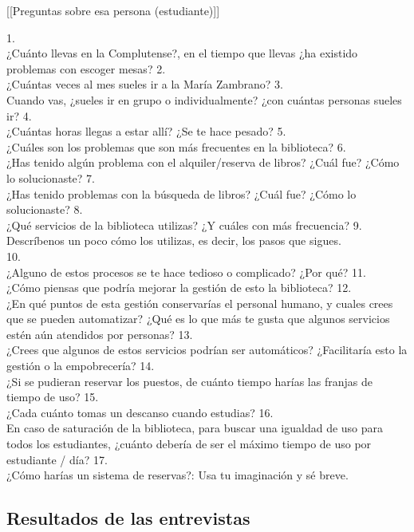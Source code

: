 \documentclass[12pt]{article}
\begin{document}
[[Preguntas sobre esa persona (estudiante)]]

1.\\ ¿Cuánto llevas en la Complutense?, en el tiempo que llevas ¿ha existido problemas con escoger mesas? 
2.\\ ¿Cuántas veces al mes sueles ir a la María Zambrano? 
3.\\ Cuando vas, ¿sueles ir en grupo o individualmente? ¿con cuántas personas sueles ir? 
4.\\ ¿Cuántas horas llegas a estar allí? ¿Se te hace pesado? 
5.\\ ¿Cuáles son los problemas que son más frecuentes en la biblioteca? 
6.\\ ¿Has tenido algún problema con el alquiler/reserva de libros? ¿Cuál fue? ¿Cómo lo solucionaste? 
7.\\ ¿Has tenido problemas con la búsqueda de libros? ¿Cuál fue? ¿Cómo lo solucionaste? 
8.\\ ¿Qué servicios de la biblioteca utilizas? ¿Y cuáles con más frecuencia? 
9.\\ Descríbenos un poco cómo los utilizas, es decir, los pasos que sigues.\\ 
10.\\ ¿Alguno de estos procesos se te hace tedioso o complicado? ¿Por qué? 
11.\\ ¿Cómo piensas que podría mejorar la gestión de esto la biblioteca? 
12.\\ ¿En qué puntos de esta gestión conservarías el personal humano, y cuales crees que se pueden automatizar? ¿Qué es lo que más te gusta que algunos servicios estén aún atendidos por personas? 
13.\\ ¿Crees que algunos de estos servicios podrían ser automáticos? ¿Facilitaría esto la gestión o la empobrecería? 
14.\\ ¿Si se pudieran reservar los puestos, de cuánto tiempo harías las franjas de tiempo de uso?
15.\\ ¿Cada cuánto tomas un descanso cuando estudias? 
16.\\ En caso de saturación de la biblioteca, para buscar una igualdad de uso para todos los estudiantes, ¿cuánto debería de ser el máximo tiempo de uso por estudiante / día?
17.\\ ¿Cómo harías un sistema de reservas?: Usa tu imaginación y sé breve.\\



\subsection{Resultados de las entrevistas}
\end{document}

